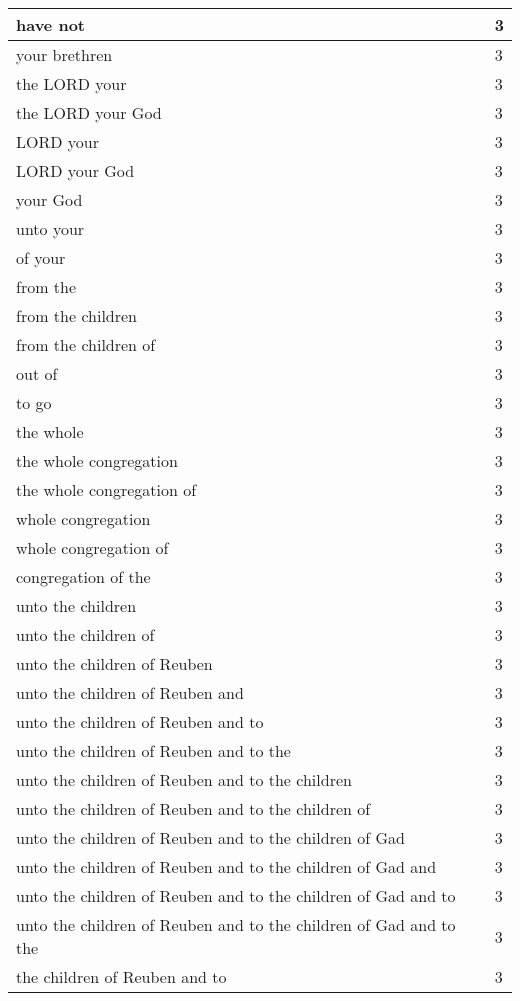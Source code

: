 \begin{center}
\begin{longtable}{|p{3.0in}|p{0.5in}|}
have not & 3\\ \hline 
your brethren & 3\\ \hline 
the LORD your & 3\\ \hline 
the LORD your God & 3\\ \hline 
LORD your & 3\\ \hline 
LORD your God & 3\\ \hline 
your God & 3\\ \hline 
unto your & 3\\ \hline 
of your & 3\\ \hline 
from the & 3\\ \hline 
from the children & 3\\ \hline 
from the children of & 3\\ \hline 
out of & 3\\ \hline 
to go & 3\\ \hline 
the whole & 3\\ \hline 
the whole congregation & 3\\ \hline 
the whole congregation of & 3\\ \hline 
whole congregation & 3\\ \hline 
whole congregation of & 3\\ \hline 
congregation of the & 3\\ \hline 
unto the children & 3\\ \hline 
unto the children of & 3\\ \hline 
unto the children of Reuben & 3\\ \hline 
unto the children of Reuben and & 3\\ \hline 
unto the children of Reuben and to & 3\\ \hline 
unto the children of Reuben and to the & 3\\ \hline 
unto the children of Reuben and to the children & 3\\ \hline 
unto the children of Reuben and to the children of & 3\\ \hline 
unto the children of Reuben and to the children of Gad & 3\\ \hline 
unto the children of Reuben and to the children of Gad and & 3\\ \hline 
unto the children of Reuben and to the children of Gad and to & 3\\ \hline 
unto the children of Reuben and to the children of Gad and to the & 3\\ \hline 
the children of Reuben and to & 3\\ \hline 

\end{longtable}
\end{center}
